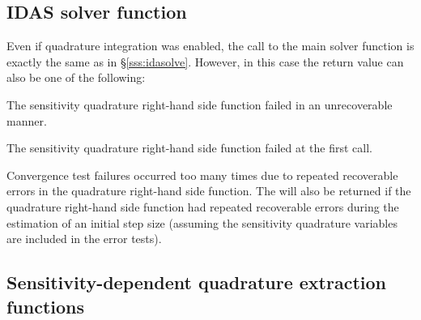 
\subsection{IDAS solver function}

Even if quadrature integration was enabled, the call to the main solver 
function  is exactly the same as in \S\ref{sss:idasolve}. However, in this
case the return value  can also be one of the following:
\begin{args}
\item[\Id{IDA\_QSRHS\_FAIL}]
  The sensitivity quadrature right-hand side function failed in an unrecoverable manner.
\item[\Id{IDA\_FIRST\_QSRHS\_ERR}]
  The sensitivity quadrature right-hand side function failed at the first call.
\item[\Id{IDA\_REP\_QSRHS\_ERR}]
  Convergence test failures occurred too many times due to repeated recoverable errors in
  the quadrature right-hand side function. The  will also
  be returned if the quadrature right-hand side function had repeated recoverable errors
  during the estimation of an initial step size (assuming the sensitivity quadrature
  variables are included in the error tests).
  \end{args}


\subsection{Sensitivity-dependent quadrature extraction functions}\label{ss:quad_sens_get}

